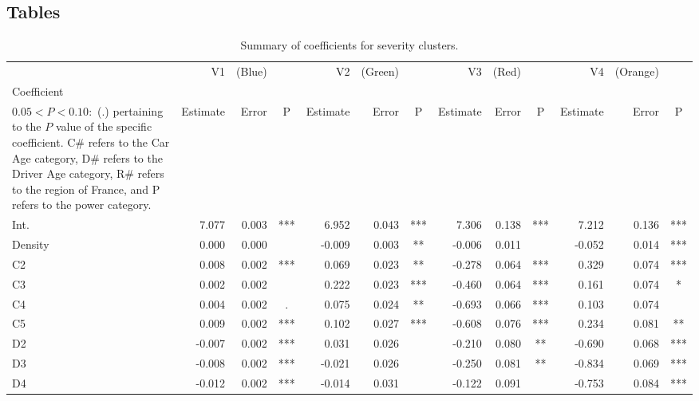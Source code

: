 \documentclass[11pt,letterpaper]{article}
\numberwithin{equation}{section}
\numberwithin{equation}{section}
\numberwithin{equation}{section}
\begin{document}
\begin{center}
\begin{table}

\section{Tables}\label{app:tables}

\caption{ Summary of coefficients for severity clusters.}
\label{severity_coef_table}
\begin{tabular}{|l|rrc|rrc|rrc|rrc|}
\hline\hline
         & V1         & (Blue)     &    & V2         & (Green)   &    & V3          & (Red)     &    & V4          & (Orange)     &    \\
Coefficient \footnote{The significance codes are defined as $  P < 0.001 : $  (***), $0.001 < P < 0.01:$ (**), $  0.01 < P < 0.05:$ (*),\\ $0.05 < P < 0.10 : $ (.) %
pertaining to the $P$ value of the specific coefficient. C\# refers to the Car Age category, D\# refers to the Driver Age category, R\# refers to the region of France, and P refers to the power category.  }      & Estimate   & Error     & P   & Estimate   & Error     & P   & Estimate    & Error      & P   & Estimate    & Error      & P   \\ \hline
Int. & 7.077 & 0.003 & *** & 6.952 & 0.043 & *** & 7.306 & 0.138 & *** & 7.212 & 0.136 & *** \\
Density & 0.000 & 0.000 &  & -0.009 & 0.003 & ** & -0.006 & 0.011 &  & -0.052 & 0.014 & *** \\
C2 & 0.008 & 0.002 & *** & 0.069 & 0.023 & ** & -0.278 & 0.064 & *** & 0.329 & 0.074 & *** \\
C3 & 0.002 & 0.002 &  & 0.222 & 0.023 & *** & -0.460 & 0.064 & *** & 0.161 & 0.074 & * \\
C4 & 0.004 & 0.002 & . & 0.075 & 0.024 & ** & -0.693 & 0.066 & *** & 0.103 & 0.074 &  \\
C5 & 0.009 & 0.002 & *** & 0.102 & 0.027 & *** & -0.608 & 0.076 & *** & 0.234 & 0.081 & ** \\
D2 & -0.007 & 0.002 & *** & 0.031 & 0.026 &  & -0.210 & 0.080 & ** & -0.690 & 0.068 & *** \\
D3 & -0.008 & 0.002 & *** & -0.021 & 0.026 &  & -0.250 & 0.081 & ** & -0.834 & 0.069 & *** \\
D4 & -0.012 & 0.002 & *** & -0.014 & 0.031 &  & -0.122 & 0.091 &  & -0.753 & 0.084 & *** \\

\end{tabular}
\end{table}
\end{center}
\end{document}
